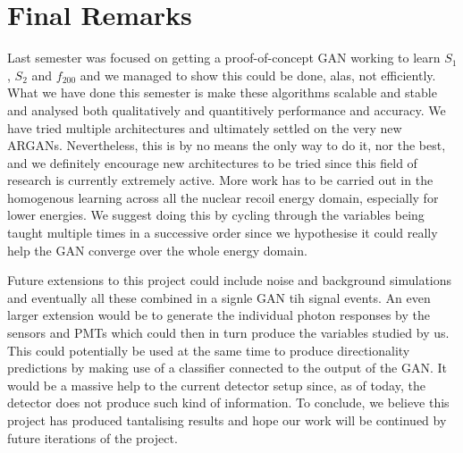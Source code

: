 \documentclass[11pt]{article} %
\begin{document}
\section{Final Remarks}
Last semester was focused on getting a proof-of-concept GAN working to learn $S_1$, $S_2$ and $f_{200}$ and we managed to show this could be done, alas, not efficiently.
What we have done this semester is make these algorithms scalable and stable and analysed both qualitatively and quantitively performance and accuracy.
We have tried multiple architectures and ultimately settled on the very new ARGANs.
Nevertheless, this is by no means
the only way to do it, nor the best, and we definitely encourage new architectures to be tried since this field of research is currently extremely active.
More work has to be carried out in the homogenous learning across all the nuclear recoil energy domain, especially for lower energies.
We suggest doing this by cycling through the variables being taught multiple times in a successive order since we hypothesise it could
really help the GAN converge over the whole energy domain.
\\
\par Future extensions to this project could include noise and background simulations and eventually all these combined in a signle GAN tih signal events.
An even larger extension would be to generate the individual photon responses by the sensors and PMTs which could then in turn produce the variables studied by us.
This could potentially be used at the same time to produce directionality predictions by making use of a classifier connected to the output of the GAN.
It would be a massive help to the current detector setup since, as of today, the detector does not produce such kind of information.
To conclude, we believe this project has produced tantalising results and hope our work will be continued by future iterations of the project.
\newpage
\printbibliography
\newpage
\end{document}
